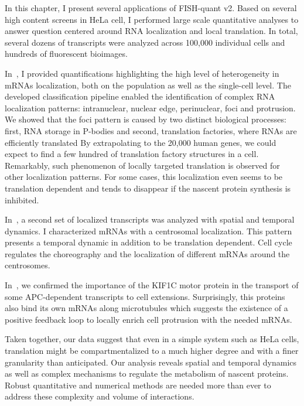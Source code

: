 In this chapter, I present several applications of FISH-quant v2.
Based on several high content screens in HeLa cell, I performed large scale quantitative analyses to answer question centered around RNA localization and local translation.
In total, several dozens of transcripts were analyzed across 100,000 individual cells and hundreds of fluorescent bioimages.

In~\cite{CHOUAIB_2020}, I provided quantifications highlighting the high level of heterogeneity in \ac{mRNA}s localization, both on the population as well as the single-cell level.
The developed classification pipeline enabled the identification of complex RNA localization patterns: intranuclear, nuclear edge, perinuclear, foci and protrusion.
We showed that the foci pattern is caused by two distinct biological processes: first, RNA storage in \ac{P-bodies} and second, translation factories, where RNAs are efficiently translated
By extrapolating to the 20,000 human genes, we could expect to find a few hundred of translation factory structures in a cell.
Remarkably, such phenomenon of locally targeted translation is observed for other localization patterns.
For some cases, this localization even seems to be translation dependent and tends to disappear if the nascent protein synthesis is inhibited.

In~\cite{safieddine_choreography_2021}, a second set of localized transcripts was analyzed with spatial and temporal dynamics.
I characterized \ac{mRNA}s with a centrosomal localization.
This pattern presents a temporal dynamic in addition to be translation dependent.
Cell cycle regulates the choreography and the localization of different \ac{mRNA}s around the centrosomes.

In~\cite{pichon_kinesin_2021}, we confirmed the importance of the KIF1C motor protein in the transport of some APC-dependent transcripts to cell extensions.
Surprisingly, this proteins also bind its own \ac{mRNA}s along microtubules which suggests the existence of a positive feedback loop to locally enrich cell protrusion with the needed \ac{mRNA}s.

Taken together, our data suggest that even in a simple system such as HeLa cells, translation might be compartmentalized to a much higher degree and with a finer granularity than anticipated.
Our analysis reveals spatial and temporal dynamics as well as complex mechanisms to regulate the metabolism of nascent proteins.
Robust quantitative and numerical methods are needed more than ever to address these complexity and volume of interactions.
